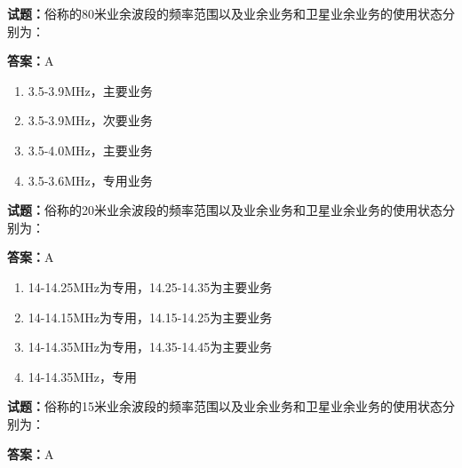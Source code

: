 \documentclass{ctexbook}
\begin{document}




\vspace{1em}

\textbf{试题：}俗称的80米业余波段的频率范围以及业余业务和卫星业余业务的使用状态分别为： 

\textbf{答案：}A 

\begin{enumerate}[leftmargin=3em]
  \item 3.5-3.9MHz，主要业务 

  \item 3.5-3.9MHz，次要业务 

  \item 3.5-4.0MHz，主要业务 

  \item 3.5-3.6MHz，专用业务 

\end{enumerate}





\vspace{1em}

\textbf{试题：}俗称的20米业余波段的频率范围以及业余业务和卫星业余业务的使用状态分别为： 

\textbf{答案：}A 

\begin{enumerate}[leftmargin=3em]
  \item 14-14.25MHz为专用，14.25-14.35为主要业务 

  \item 14-14.15MHz为专用，14.15-14.25为主要业务 

  \item 14-14.35MHz为专用，14.35-14.45为主要业务 

  \item 14-14.35MHz，专用 

\end{enumerate}





\vspace{1em}

\textbf{试题：}俗称的15米业余波段的频率范围以及业余业务和卫星业余业务的使用状态分别为： 

\textbf{答案：}A 
\end{document}
